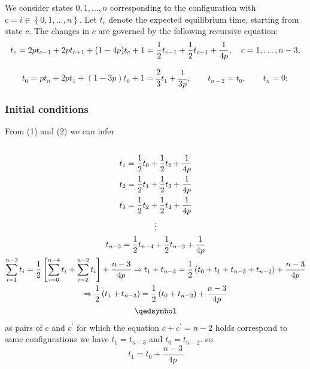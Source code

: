 \documentclass[]{book}
\theoremstyle{definition}
\begin{document}
We consider states $0,1,\ldots,n$ corresponding to the configuration with $c = i \in \left\{0,1,\ldots,n\right\}$. 
Let $t_c$ denote the expected equilibrium time, starting from state $c$.
The changes in $c$ are governed by the following recursive equation:
\begin{equation}    \label{mainEquation}
    t_c 
    = 2p t_{c-1}  + 2p t_{c+1} + (1 - 4p)t_{c} + 1\\
    = \frac{1}{2}t_{c-1} + \frac{1}{2}t_{c+1} + \frac{1}{4p}, \quad c = 1,\ldots,n-3,
\end{equation}

\begin{equation}\label{recursiveEquation_t_0}
    t_0 = pt_{n} + 2pt_1 + (1-3p)t_0  + 1 = \frac{2}{3}t_1 + \frac{1}{3p}, \qquad t_{n-2}=t_0, \qquad t_n = 0;
\end{equation}





\subsubsection*{Initial conditions}

From (1) and (2) we can infer
\begin{multline*}
    \\
    t_1 = \frac{1}{2}t_0 + \frac{1}{2}t_2 + \frac{1}{4p}\\
    t_2 = \frac{1}{2}t_1 + \frac{1}{2}t_3 + \frac{1}{4p}\\
    t_3 = \frac{1}{2}t_2 + \frac{1}{2}t_4 + \frac{1}{4p}\\
    \vdots\\
    t_{n-3} = \frac{1}{2}t_{n-4} + \frac{1}{2}t_{n-2} + \frac{1}{4p}\\
    \sum_{i=1}^{n-3} t_i = \frac{1}{2}\left[ \sum_{i=0}^{n-4} t_i + \sum_{i=2}^{n-2} t_i \right] + \frac{n-3}{4p} \Rightarrow t_1 + t_{n-3} = \frac{1}{2}\left(t_0 + t_1 + t_{n-3} + t_{n-2}\right) + \frac{n-3}{4p}\\
    \Rightarrow \frac{1}{2}\left(t_1 + t_{n-3}\right) = \frac{1}{2}\left(t_0 + t_{n-2}\right) + \frac{n-3}{4p}\\
    \qedsymbol
\end{multline*}
as pairs of $c$ and $c^{\prime}$ for which the equation $c + c^{\prime} = n - 2$ holds correspond to same configurations we have $t_{1} = t_{n-3}$ and $t_{0} = t_{n-2}$. so
\begin{equation}
    t_1 = t_0 + \frac{n-3}{4p}
\end{equation}
\end{document}
